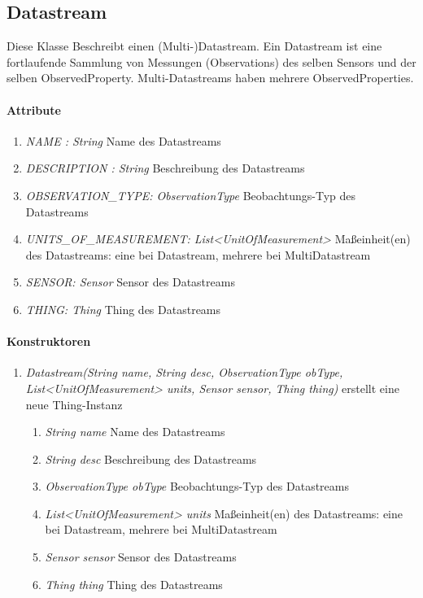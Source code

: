 \subsection*{Datastream}\label{data}
Diese Klasse Beschreibt einen (Multi-)Datastream. Ein Datastream ist eine fortlaufende Sammlung von Messungen (Observations) des selben Sensors und der selben ObservedProperty. Multi-Datastreams haben mehrere ObservedProperties.

\paragraph{Attribute}
\begin{enumerate}[$\bullet$]
	\item \textit{NAME : String} Name des Datastreams
	\item \textit{DESCRIPTION : String} Beschreibung des Datastreams
	\item \textit{OBSERVATION\_TYPE: ObservationType} Beobachtungs-Typ des Datastreams
	\item \textit{UNITS\_OF\_MEASUREMENT: List<UnitOfMeasurement>} Maßeinheit(en) des Datastreams: eine bei Datastream, mehrere bei MultiDatastream
	\item \textit{SENSOR: Sensor} Sensor des Datastreams
	\item \textit{THING: Thing} Thing des Datastreams
	
\end{enumerate}

\paragraph{Konstruktoren}
\begin{enumerate}[+]
	\item \textit{Datastream(String name, String desc, ObservationType obType,  List<UnitOfMeasurement> units, Sensor sensor, Thing thing)}
	erstellt eine neue Thing-Instanz
	\begin{enumerate}[$\bullet$]
		\item \textit{String name} Name des Datastreams
		\item \textit{String desc} Beschreibung des Datastreams
		\item \textit{ObservationType obType} Beobachtungs-Typ des Datastreams
		\item \textit{List<UnitOfMeasurement> units} Maßeinheit(en) des Datastreams: eine bei Datastream, mehrere bei MultiDatastream
		\item \textit{Sensor sensor} Sensor des Datastreams
		\item \textit{Thing thing} Thing des Datastreams
	\end{enumerate}
	
\end{enumerate}
